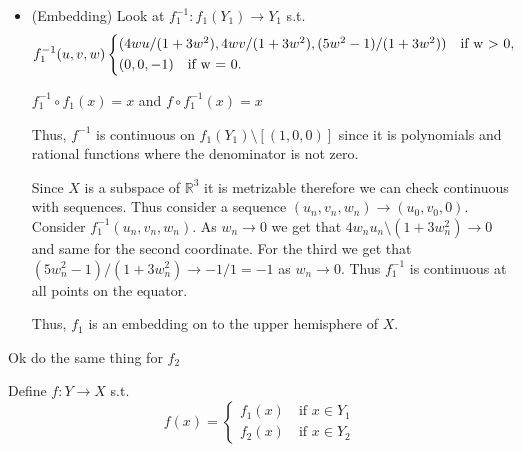 \documentclass[12pt, letterpaper]{article}
\newcommand{\R}{\mathbb{R}}
\renewcommand{\t}[1]{\text{#1}}
\begin{document}
\begin{itemize}
    Thus, the $z$ coordinate is less than epsilon away from the $0$. Thus, $f_1(x,y,z) \in \bigcup_{s \in E}B(s,\epsilon_e) \subseteq q^{-1}(U)$. This makes sense because we are only looking at when $f_1$ maps to the non-equivalence relation part of $X$. 
    Thus, since $q$ surjective and $f_1(x,y,z)$ is away from the south pole thus $q(f_1(x,y,z))=[f_1(x,y,z)]=\{f_1(x,y,z)\}$. Thus, we get $q(f_1(x,y,z))=f_1(x,y,z) \in q(\bigcup_{s \in E}B(s,\epsilon_e)) \subset U$. 
    Thus let $V$ be the open neighborhood in $Y_1$ s.t. $V=\{(x,y,z) \in Y_1 \mid |z+1| < \delta\}$. By aboce we know this means that the third coordinate of $|f_(x,y,z)| < \epsilon$ which implies $f_1(x,y,z) \in \bigcup_{s \in E}B(s,\epsilon_e) \subseteq q^{-1}(U)$. Thus, $q(f_1(x,y,z))=f_1(x,y,z) \in q(\in \bigcup_{s \in E}B(s,\epsilon_e)) \subseteq U$ since $q$ is surjective. Thus, $f_1(V) \subseteq U$. Thus, we are continuous at (0,0,-1).

    Thus, $f_1$ is continuous.

    \item (Embedding) Look at $f_1^{-1}: f_1(Y_1) \to Y_1$ s.t.
    \begin{equation*}
        f_1^{-1}(u,v,w)\begin{cases*}
            (4wu/(1+3w^2),4wv/(1+3w^2),(5w^2-1)/(1+3w^2)) \quad \t{if } $w > 0$,\\
            (0,0,-1) \quad \t{if } $w = 0$.
        \end{cases*}
    \end{equation*}

    $f^{-1}_1 \circ f_1 (x)=x$ and $f \circ f^{-1}_1(x)=x$

    Thus, $f^{-1}$ is continuous on $f_1(Y_1) \setminus [(1,0,0)]$ since it is polynomials and rational functions where the denominator is not zero.

    Since $X$ is a subspace of $\R^3$ it is metrizable therefore we can check continuous with sequences. Thus consider a sequence $(u_n,v_n,w_n) \to (u_0,v_0,0)$. Consider $f_1^{-1}(u_n,v_n,w_n)$. As $w_n \to 0$ we get that $4w_nu_n \setminus (1+3w_n^2) \to 0$ and same for the second coordinate. For the third we get that $(5w_n^2-1)/(1+3w_n^2) \to -1/1 = -1$ as $w_n \to 0$. Thus $f_1^{-1}$ is continuous at all points on the equator.

    Thus, $f_1$ is an embedding on to the upper hemisphere of $X$.
\end{itemize}
Ok do the same thing for $f_2$

Define $f : Y \to X$ s.t.
\begin{equation*}
    f(x)=\begin{cases}
        f_1(x) \quad \t{if } x \in Y_1\\
        f_2(x) \quad \t{if } x \in Y_2
    \end{cases}
\end{equation*} 
\end{document}
